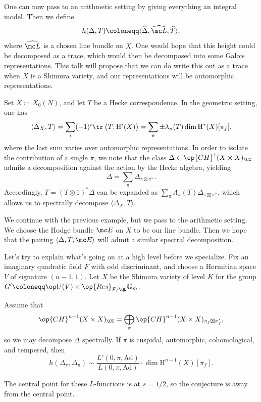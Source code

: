\documentclass{article}
\begin{document}
One can now pass to an arithmetic setting by giving everything an integral model. Then we define
\[h(\Delta,T)\coloneqq\langle\widehat\Delta,\widehat{\mc L},\widehat T\rangle,\]
where $\widehat{\mc L}$ is a chosen line bundle on $X$. One would hope that this height could be decomposed as a trace, which would then be decomposed into some Galois representations. This talk will propose that we can do write this out as a trace when $X$ is a Shimura variety, and our representations will be automorphic representations.
\begin{example}
	Set $X\coloneqq X_0(N)$, and let $T$ be a Hecke correspondence. In the geometric setting, one has
	\[\langle\Delta_X,T\rangle=\sum_i(-1)^i\tr\left(T;\mathrm H^i(X)\right)=\sum_\pi\pm\lambda_\pi(T)\dim\mathrm H^*(X)[\pi_f],\]
	where the last sum varies over automorphic representations. In order to isolate the contribution of a single $\pi$, we note that the class $\Delta\in\op{CH}^1(X\times X)_\CC$ admits a decomposition against the action by the Hecke algebra, yielding
	\[\Delta=\sum_\pi\Delta_{\pi\boxtimes\pi^\lor}.\]
	Accordingly, $T=(T\otimes1)^*\Delta$ can be expanded as $\sum_\pi\Lambda_\pi(T)\Delta_{\pi\boxtimes\pi^\lor}$, which allows us to spectrally decompose $\langle\Delta_X,T\rangle$.
\end{example}
\begin{example}
	We continue with the previous example, but we pass to the arithmetic setting. We choose the Hodge bundle $\mc E$ on $X$ to be our line bundle. Then we hope that the pairing $\langle\Delta,T,\mc E\rangle$ will admit a similar spectral decomposition.
\end{example}
Let's try to explain what's going on at a high level before we specialize. Fix an imaginary quadratic field $F$ with odd discriminant, and choose a Hermitian space $V$ of signature $(n-1,1)$. Let $X$ be the Shimura variety of level $K$ for the group $G'\coloneqq\op U(V)\times\op{Res}_{F/\QQ}\mathbb G_m$.
\begin{conj}
	Assume that
	\[\op{CH}^{n-1}(X\times X)_\CC=\bigoplus_{\pi}\op{CH}^{n-1}(X\times X)_{\pi_f\boxtimes\pi_f'},\]
	so we may decompose $\Delta$ spectrally. If $\pi$ is cuspidal, automorphic, cohomological, and tempered, then
	\[h(\Delta_\pi,\Delta_\pi)\sim\frac{L'(0,\pi,\mathrm{Ad})}{L(0,\pi,\mathrm{Ad})}\cdot\dim\mathrm H^{n-1}(X)[\pi_f].\]
\end{conj}
\begin{remark}
	The central point for these $L$-functions is at $s=1/2$, so the conjecture is away from the central point.
\end{remark}
\end{document}
